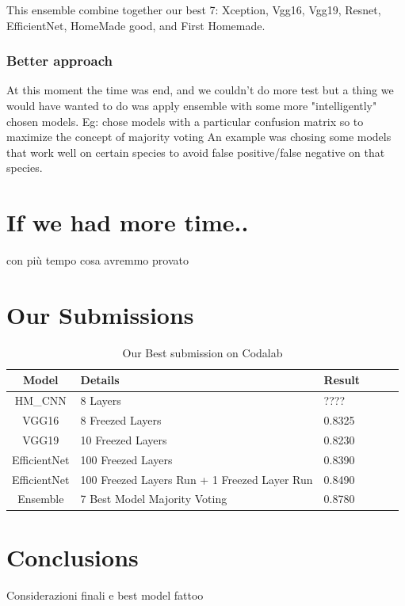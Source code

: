 \documentclass[10pt]{article}
\begin{document}
This ensemble combine together our best 7: Xception, Vgg16, Vgg19, Resnet, EfficientNet, HomeMade good, and First Homemade.

\subsubsection{Better approach}
At this moment the time was end, and we couldn't do more test but a thing we would have wanted to do was apply ensemble with some more "intelligently" chosen models.
Eg: chose models with a particular confusion matrix so to maximize the concept of majority voting
An example was chosing some models that work well on certain species to avoid false positive/false negative on that species.



\section{If we had more time..}
con più tempo cosa avremmo provato




\section{Our Submissions}
\begin{table}[ht]
\centering
\begin{adjustbox}{width=240}
\small
\begin{tabular}{|c|l|l|l|l|l}

\hline \bf Model & \bf Details & \bf Result \\ \hline
HM_{CNN} & 8 Layers & ???? \\
VGG16   & 8 Freezed Layers & 0.8325 \\
VGG19   & 10 Freezed Layers & 0.8230 \\
EfficientNet   & 100 Freezed Layers & 0.8390 \\
EfficientNet   & 100 Freezed Layers  Run + 1 Freezed Layer Run& 0.8490 \\
Ensemble & 7 Best Model Majority Voting & 0.8780 \\
\hline
\end{tabular}
\end{adjustbox}
\caption{Our Best submission on Codalab}
\end{table}
\section{Conclusions}
Considerazioni finali e best model fattoo

\end{document}
